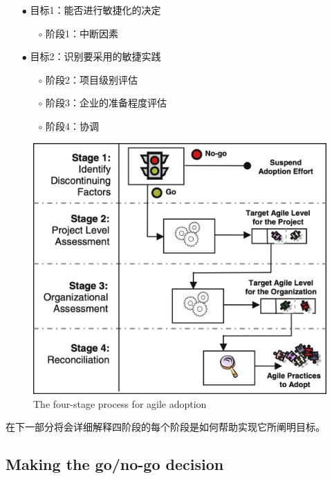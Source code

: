 \documentclass[twocolumn]{svjour3}[]
\begin{document}
\begin{itemize}
    \item[$\bullet$] 目标1：能否进行敏捷化的决定
        \begin{itemize}
            \item[$\circ$] 阶段1：中断因素
        \end{itemize}
    \item[$\bullet$] 目标2：识别要采用的敏捷实践
        \begin{itemize}
            \item[$\circ$] 阶段2：项目级别评估
            \item[$\circ$] 阶段3：企业的准备程度评估
            \item[$\circ$] 阶段4：协调
        \end{itemize}
\end{itemize}

\begin{figure} [htb]
    \centering
    \includegraphics[width=1.0\linewidth]{img/four-stage.jpg}
    \caption{The four-stage process for agile adoption}
    \label{four-stage}
\end{figure}

在下一部分将会详细解释四阶段的每个阶段是如何帮助实现它所阐明目标。

\subsection{Making the go/no-go decision}
\end{document}
